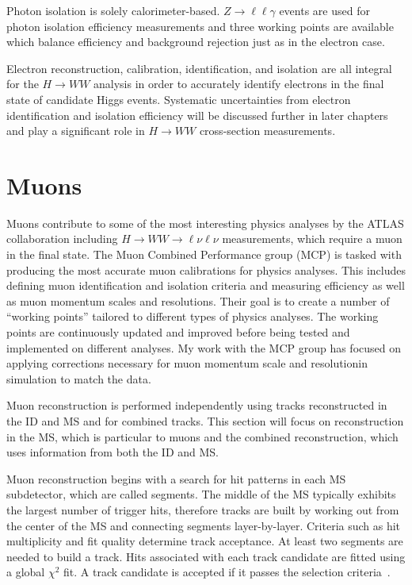 Photon isolation is solely calorimeter-based. $Z\rightarrow \ell\ell\gamma$ events are used for photon isolation efficiency measurements and three working points are available which balance efficiency and background rejection just as in the electron case. 

Electron reconstruction, calibration, identification, and isolation are all integral for the $H\rightarrow WW$ analysis in order to accurately identify electrons in the final state of candidate Higgs events. Systematic uncertainties from electron identification and isolation efficiency will be discussed further in later chapters and play a significant role in $H\rightarrow WW$ cross-section measurements. 

\section{Muons}
Muons contribute to some of the most interesting physics analyses by the ATLAS collaboration including $H\rightarrow WW\rightarrow \ell\nu\ell\nu$ measurements, which require a muon in the final state. The Muon Combined Performance group (MCP) is tasked with producing the most accurate muon calibrations for physics analyses. This includes defining muon identification and isolation criteria and measuring efficiency as well as muon momentum scales and resolutions. Their goal is to create a number of ``working points'' tailored to different types of physics analyses. The working points are continuously updated and improved before being tested and implemented on different analyses. My work with the MCP group has focused on applying corrections necessary for muon momentum scale and resolutionin simulation to match the data. 

Muon reconstruction is performed independently using tracks reconstructed in the ID and MS and for combined tracks. This section will focus on reconstruction in the MS, which is particular to muons and the combined reconstruction, which uses information from both the ID and MS. 

Muon reconstruction begins with a search for hit patterns in each MS subdetector, which are called segments. The middle of the MS typically exhibits the largest number of trigger hits, therefore tracks are built by working out from the center of the MS and connecting segments layer-by-layer. Criteria such as hit multiplicity and fit quality determine track acceptance. At least two segments are needed to build a track. Hits associated with each track candidate are fitted using a global $\chi^2$ fit. A track candidate is accepted if it passes the selection criteria~\cite{IDreconstruction}. 

